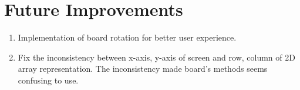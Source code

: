 \documentclass[a4paper, 10pt, titlepage]{report}
\begin{document}
\chapter{Future Improvements}
\begin{enumerate}
  \item Implementation of board rotation for better user experience.
  \item Fix the inconsistency between x-axis, y-axis of screen and row, column of 2D array representation. The inconsistency made board's methods seems confusing to use.
\end{enumerate}
\end{document}
